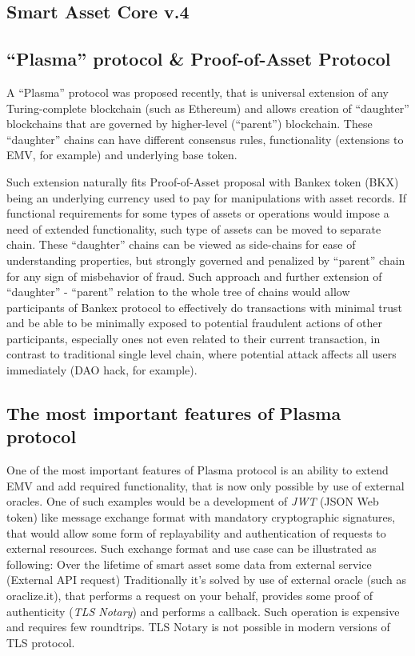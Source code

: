 \documentclass{article}
\begin{document}
\begin{multicols}{2}
\subsection{Smart Asset Core v.4}

\text{ }

\subsection{\enquote{Plasma} protocol \& Proof-of-Asset Protocol}

A \enquote{Plasma} protocol was proposed recently, that is universal extension of any Turing-complete blockchain (such as Ethereum)  and allows creation of \enquote{daughter} blockchains that are governed by higher-level (\enquote{parent}) blockchain. These \enquote{daughter} chains can have different consensus rules, functionality (extensions to EMV, for example) and underlying base token. 

Such extension naturally fits Proof-of-Asset proposal with Bankex token (BKX) being an underlying currency used to pay for manipulations with asset records. If functional requirements for some types of assets or operations would impose a need of extended functionality, such type of assets can be moved to separate chain. These \enquote{daughter} chains can be viewed as side-chains for ease of understanding properties, but strongly governed and penalized by \enquote{parent} chain for any sign of misbehavior of fraud. Such approach and further extension of \enquote{daughter} - \enquote{parent} relation to the whole tree of chains would allow participants of Bankex protocol to effectively do transactions with minimal trust and be able to be minimally exposed to potential fraudulent actions of other participants, especially ones not even related to their current transaction, in contrast to traditional single level chain, where potential attack affects all users immediately (DAO hack, for example). 

\subsection{The most important features of Plasma protocol}

One of the most important features of Plasma protocol is an ability to extend EMV and add required functionality, that is now only possible by use of external oracles. One of such examples would be a development of \textit{JWT} (JSON Web token) like message exchange format with mandatory cryptographic signatures, that would allow some form of replayability and authentication of requests to external resources. Such exchange format and use case can be illustrated as following:
Over the lifetime of smart asset some data from external service (External API request)
Traditionally it’s solved by use of external oracle (such as oraclize.it), that performs a request on your behalf, provides some proof of authenticity (\textit{TLS Notary}) and performs a callback.
Such operation is expensive and requires few roundtrips. TLS Notary is not possible in modern versions of TLS protocol.


\end{multicols}
\end{document}
